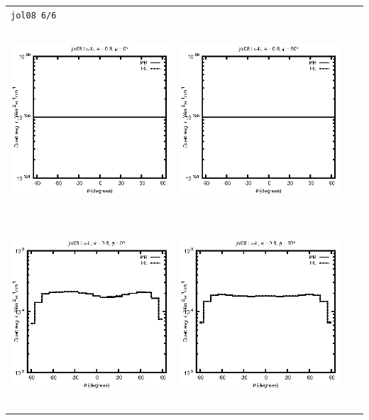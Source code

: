 \begin{tabular}{c c c c}
\multicolumn{4}{l}{\texttt{jol08 6/6}} \\
\includegraphics[height=7cm]{../eps/jol08_Lu_b_fwd.eps} &
\includegraphics[height=7cm]{../eps/jol08_Lu_b_cross.eps} \\
\includegraphics[height=7cm]{../eps/jol08_Lu_it_fwd.eps} &
\includegraphics[height=7cm]{../eps/jol08_Lu_it_cross.eps} \\

\end{tabular}
